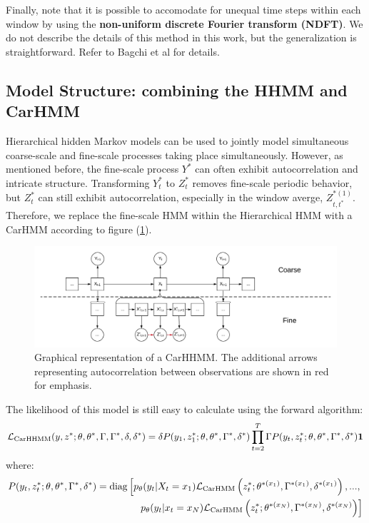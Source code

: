 Finally, note that it is possible to accomodate for unequal time steps within each window by using the \textbf{non-uniform discrete Fourier transform (NDFT)}. We do not describe the details of this method in this work, but the generalization is straightforward. Refer to Bagchi et al \cite{Bagchi:2001} for details.


\subsection{Model Structure: combining the HHMM and CarHMM}

Hierarchical hidden Markov models can be used to jointly model simultaneous coarse-scale and fine-scale processes taking place simultaneously. However, as mentioned before, the fine-scale process $Y^*$ can often exhibit autocorrelation and intricate structure. Transforming $Y^*_t$ to $Z^*_t$ removes fine-scale periodic behavior, but $Z^*_t$ can still exhibit autocorrelation, especially in the window averge, $Z_{t,t^*}^{*(1)}$. Therefore, we replace the fine-scale HMM within the Hierarchical HMM with a CarHMM according to figure (\ref{fig:CarHHMM}).

\begin{figure}[h!]
	\centering
	\includegraphics[width=7.5in]{../Plots/CarHHMM.png}
	\caption{Graphical representation of a CarHHMM. The additional arrows representing autocorrelation between observations are shown in red for emphasis.}
	\label{fig:CarHHMM}
\end{figure}

The likelihood of this model is still easy to calculate using the forward algorithm:
%
$$\mathcal{L}_{\text{CarHHMM}}(y,z^*;\theta,\theta^*,\Gamma,\Gamma^*,\delta,\delta^*) = \delta P(y_1,z_1^*;\theta,\theta^*,\Gamma^*,\delta^*) \prod_{t=2}^T \Gamma P(y_t,z_t^*;\theta,\theta^*,\Gamma^*,\delta^*) \mathbf{1}$$
%
where:
%
\begin{align*}
P(y_t,z_t^*;\theta,\theta^*,\Gamma^*,\delta^*)  = \text{diag}\left[p_{\theta}(y_t|X_t = x_1)\mathcal{L}_{\text{CarHMM}}\left(z_t^*;\theta^{*(x_1)},\Gamma^{*(x_1)},\delta^{*(x_1)}\right), . . . , \right.\\
\left. p_{\theta}(y_t|x_t = x_N )\mathcal{L}_{\text{CarHMM}}\left(z_t^*;\theta^{*(x_N)},\Gamma^{*(x_N)},\delta^{*(x_N)}\right) \right]
\end{align*}
%
